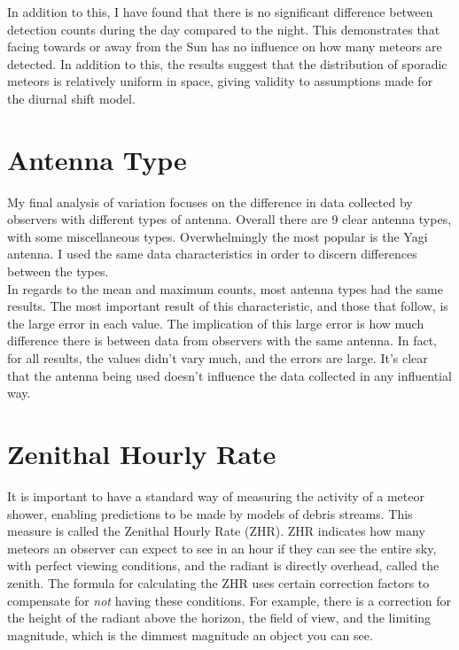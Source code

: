 \documentclass[12pt]{article}
\begin{document}
{{In addition to this, I have found that there is no significant difference
between detection counts during the day compared to the night. This demonstrates
that facing towards or away from the Sun has no influence on how many meteors
are detected. In addition to this, the results suggest that the distribution of
sporadic meteors is relatively uniform in space, giving validity to assumptions
made for the diurnal shift model.\\
}

\section{Antenna Type}

\large{
My final analysis of variation focuses on the difference in data collected by
observers with different types of antenna. Overall there are 9 clear antenna
types, with some miscellaneous types. Overwhelmingly the most popular is the
Yagi antenna. I used the same data characteristics in order to discern
differences between the types.\\

In regards to the mean and maximum counts, most antenna types had the same
results. The most important result of this characteristic, and those that
follow, is the large error in each value. The implication of this large error is
how much difference there is between data from observers with the same
antenna. In fact, for all results, the values didn't vary much, and the errors
are large. It's clear that the antenna being used doesn't influence the data
collected in any influential way.\\
}

\section{Zenithal Hourly Rate}

\large{
It is important to have a standard way of measuring the activity of a meteor
shower, enabling predictions to be made by models of debris streams. This
measure is called the Zenithal Hourly Rate (ZHR). ZHR indicates how many meteors
an observer can expect to see in an hour if they can see the entire sky, with
perfect viewing conditions, and the radiant is directly overhead, called the
zenith. The formula for calculating the ZHR uses certain correction factors to
compensate for {\it not} having these conditions. For example, there is a
correction for the height of the radiant above the horizon, the field of view,
and the limiting magnitude, which is the dimmest magnitude an object you can
see.\\

}}
\end{document}
